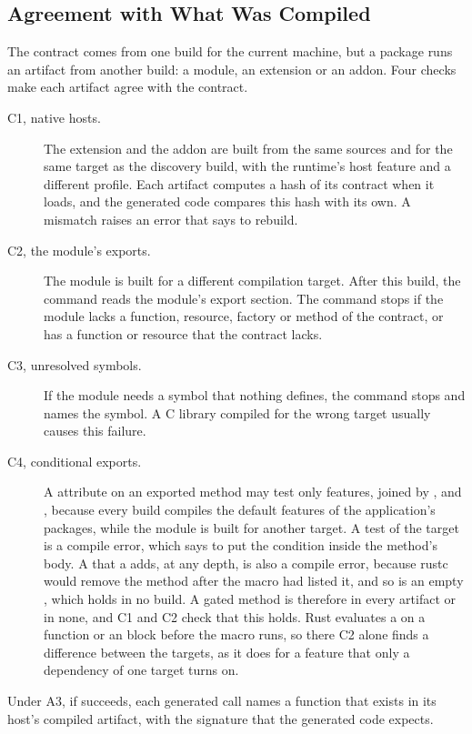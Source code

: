 \documentclass[sigconf,nonacm]{acmart}
\begin{document}
\subsection{Agreement with What Was Compiled}

The contract comes from one build for the current machine, but a package runs an artifact from another build: a module, an extension or an addon. Four checks make each artifact agree with the contract.

\begin{description}
\item[C1, native hosts.] The extension and the addon are built from the same sources and for the same target as the discovery build, with the runtime's host feature and a different profile. Each artifact computes a hash of its contract when it loads, and the generated code compares this hash with its own. A mismatch raises an error that says to rebuild.
\item[C2, the module's exports.] The module is built for a different compilation target. After this build, the command reads the module's export section. The command stops if the module lacks a function, resource, factory or method of the contract, or has a function or resource that the contract lacks.
\item[C3, unresolved symbols.] If the module needs a symbol that nothing defines, the command stops and names the symbol. A C library compiled for the wrong target usually causes this failure.
\item[C4, conditional exports.] A \ttt{\#[cfg]} attribute on an exported method may test only features, joined by ,  and , because every build compiles the default features of the application's packages, while the module is built for another target. A test of the target is a compile error, which says to put the condition inside the method's body. A  that a  adds, at any depth, is also a compile error, because rustc would remove the method after the macro had listed it, and so is an empty , which holds in no build. A gated method is therefore in every artifact or in none, and C1 and C2 check that this holds. Rust evaluates a \ttt{\#[cfg]} on a function or an  block before the macro runs, so there C2 alone finds a difference between the targets, as it does for a feature that only a dependency of one target turns on.
\end{description}

\begin{claim}[Agreement]
\label{clm:agreement}
Under A3, if  succeeds, each generated call names a function that exists in its host's compiled artifact, with the signature that the generated code expects.
\end{claim}
\end{document}
